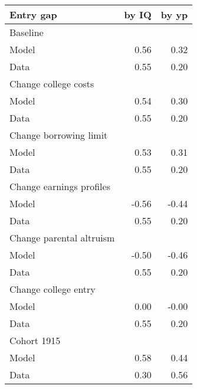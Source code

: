 \begin{tabular}{lrr}
\hline
Entry gap & by IQ  & by yp  \\ 
\hline
Baseline &   &   \\ 
Model & 0.56  & 0.32  \\ 
Data & 0.55  & 0.20  \\ 
Change college costs &   &   \\ 
Model & 0.54  & 0.30  \\ 
Data & 0.55  & 0.20  \\ 
Change borrowing limit &   &   \\ 
Model & 0.53  & 0.31  \\ 
Data & 0.55  & 0.20  \\ 
Change earnings profiles &   &   \\ 
Model & -0.56  & -0.44  \\ 
Data & 0.55  & 0.20  \\ 
Change parental altruism &   &   \\ 
Model & -0.50  & -0.46  \\ 
Data & 0.55  & 0.20  \\ 
Change college entry &   &   \\ 
Model & 0.00  & -0.00  \\ 
Data & 0.55  & 0.20  \\ 
Cohort 1915 &   &   \\ 
Model & 0.58  & 0.44  \\ 
Data & 0.30  & 0.56  \\ 
\hline
\end{tabular}%
